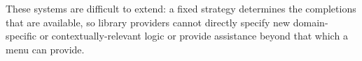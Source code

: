 
These systems are difficult to extend: a fixed strategy determines the completions that are available, so library providers cannot directly specify new domain-specific or contextually-relevant logic or provide assistance beyond that which a menu can provide. 


